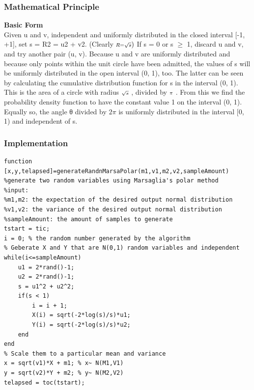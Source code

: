 \documentclass[twoside]{article}
\begin{document}
\begin{multicols*}{2}
\subsubsection{Mathematical Principle}
\noindent \textbf {Basic Form}\\
Given u and v, independent and uniformly distributed in the closed interval [-1, +1], set s = R2 = u2 + v2. (Clearly ${\displaystyle \scriptstyle R={\sqrt {s}}})$  If s = 0 or s $\geq$ 1, discard u and v, and try another pair (u, v). Because u and v are uniformly distributed and because only points within the unit circle have been admitted, the values of s will be uniformly distributed in the open interval (0, 1), too. The latter can be seen by calculating the cumulative distribution function for s in the interval (0, 1). This is the area of a circle with radius ${\displaystyle \scriptstyle {\sqrt {s}}}$ , divided by ${\displaystyle \scriptstyle \pi }$ . From this we find the probability density function to have the constant value 1 on the interval (0, 1). Equally so, the angle θ divided by $2 \pi$ is uniformly distributed in the interval [0, 1) and independent of s.\\
\subsubsection{Implementation}
\begin{lstlisting}
function [x,y,telapsed]=generateRandnMarsaPolar(m1,v1,m2,v2,sampleAmount)
%generate two random variables using Marsaglia's polar method
%input: 
%m1,m2: the expectation of the desired output normal distribution
%v1,v2: the variance of the desired output normal distribution
%sampleAmount: the amount of samples to generate 
tstart = tic;
i = 0; % the random number generated by the algorithm 
% Geberate X and Y that are N(0,1) random variables and independent
while(i<=sampleAmount)
    u1 = 2*rand()-1;
    u2 = 2*rand()-1;
    s = u1^2 + u2^2;
    if(s < 1)
        i = i + 1;
        X(i) = sqrt(-2*log(s)/s)*u1;
        Y(i) = sqrt(-2*log(s)/s)*u2;
    end
end
% Scale them to a particular mean and variance 
x = sqrt(v1)*X + m1; % x~ N(M1,V1)
y = sqrt(v2)*Y + m2; % y~ N(M2,V2)
telapsed = toc(tstart);
\end{lstlisting}


\end{multicols*}
\end{document}
